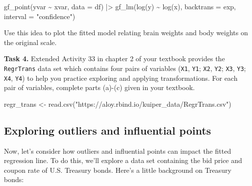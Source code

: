 \documentclass[
  letterpaper,
  DIV=11,
  numbers=noendperiod]{scrartcl}
\newenvironment{Shaded}{\begin{snugshade}}{\end{snugshade}}
\newcommand{\AttributeTok}[1]{\textcolor[rgb]{0.40,0.45,0.13}{#1}}
\newcommand{\FunctionTok}[1]{\textcolor[rgb]{0.28,0.35,0.67}{#1}}
\newcommand{\NormalTok}[1]{\textcolor[rgb]{0.00,0.23,0.31}{#1}}
\newcommand{\OtherTok}[1]{\textcolor[rgb]{0.00,0.23,0.31}{#1}}
\newcommand{\SpecialCharTok}[1]{\textcolor[rgb]{0.37,0.37,0.37}{#1}}
\newcommand{\StringTok}[1]{\textcolor[rgb]{0.13,0.47,0.30}{#1}}
\begin{document}
\begin{Shaded}
\begin{Highlighting}[]
\FunctionTok{gf\_point}\NormalTok{(yvar }\SpecialCharTok{\textasciitilde{}}\NormalTok{ xvar, }\AttributeTok{data =}\NormalTok{ df) }\SpecialCharTok{|\textgreater{}}
  \FunctionTok{gf\_lm}\NormalTok{(}\FunctionTok{log}\NormalTok{(y) }\SpecialCharTok{\textasciitilde{}} \FunctionTok{log}\NormalTok{(x), }\AttributeTok{backtrans =}\NormalTok{ exp, }\AttributeTok{interval =} \StringTok{"confidence"}\NormalTok{)}
\end{Highlighting}
\end{Shaded}

Use this idea to plot the fitted model relating brain weights and body
weights on the original scale.

\bigskip

\textbf{Task 4.} Extended Activity 33 in chapter 2 of your textbook
provides the \texttt{RegrTrans} data set which contains four pairs of
variables (\texttt{X1}, \texttt{Y1}; \texttt{X2}, \texttt{Y2};
\texttt{X3}, \texttt{Y3}; \texttt{X4}, \texttt{Y4}) to help you practice
exploring and applying transformations. For each pair of variables,
complete parts (a)-(c) given in your textbook.

\begin{Shaded}
\begin{Highlighting}[]
\NormalTok{regr\_trans }\OtherTok{\textless{}{-}} \FunctionTok{read.csv}\NormalTok{(}\StringTok{"https://aloy.rbind.io/kuiper\_data/RegrTrans.csv"}\NormalTok{)}
\end{Highlighting}
\end{Shaded}

\hypertarget{exploring-outliers-and-influential-points}{%
\subsection{Exploring outliers and influential
points}\label{exploring-outliers-and-influential-points}}

Now, let's consider how outliers and influential points can impact the
fitted regression line. To do this, we'll explore a data set containing
the bid price and coupon rate of U.S. Treasury bonds. Here's a little
background on Treasury bonds:
\end{document}
